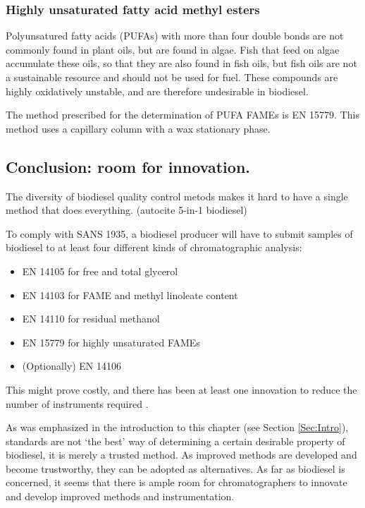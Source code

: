 \subsubsection{Highly unsaturated fatty acid methyl esters}

Polyunsatured fatty acids (PUFAs) with more than four double bonds are not
commonly found in plant oils, but are found in algae. Fish that feed on algae
accumulate these oils, so that they are also found in fish oils, but fish oils
are not a sustainable resource and should not be used for
fuel\autocite{Kitessa2014}. These compounds are highly oxidatively unstable, and are
therefore undesirable in biodiesel.

The method prescribed for the determination of PUFA FAMEs is EN 15779. This
method uses a capillary column with a wax stationary phase.

\subsection{Conclusion: room for innovation.}

The diversity of biodiesel quality control metods makes it hard to have a single
method that does everything. \todo(autocite 5-in-1 biodiesel)

To comply with SANS 1935, a biodiesel producer will have to submit samples of
biodiesel to at least four different kinds of chromatographic analysis: 

\begin{itemize}
  \item EN 14105 for free and total glycerol
  \item EN 14103 for FAME and methyl linoleate content
  \item EN 14110 for residual methanol 
  \item EN 15779 for highly unsaturated FAMEs
  \item (Optionally) EN 14106
\end{itemize}

This might prove costly, and there has been at least one innovation to reduce
the number of instruments required \autocite{McCurry2009}.

As was emphasized in the introduction to this chapter (see Section
\ref{Sec:Intro}), standards are not `the best' way of determining a certain
desirable property of biodiesel, it is merely a trusted method. As improved
methods are developed and become trustworthy, they can be adopted as
alternatives. As far as biodiesel is concerned, it seems that there is ample
room for chromatographers to innovate and develop improved methods and
instrumentation.







\todos